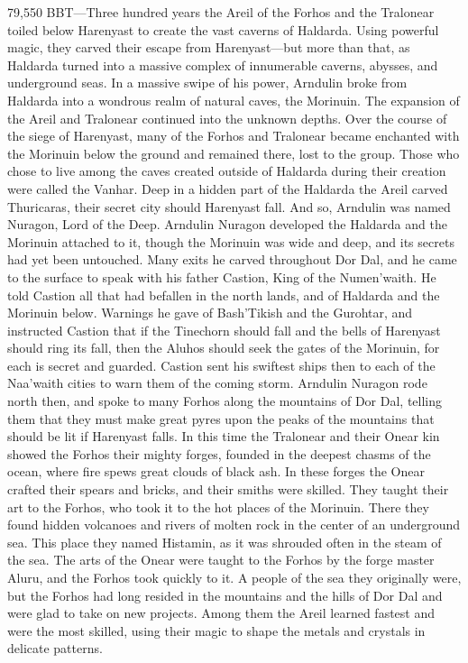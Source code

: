 \documentclass[smalldemyvopaper,11pt,twoside,onecolumn,openright,extrafontsizes]{memoir}
\begin{document}
79,550 BBT—Three hundred years the Areil of the Forhos and the Tralonear toiled below Harenyast to create the vast caverns of Haldarda. Using powerful magic, they carved their escape from Harenyast—but more than that, as Haldarda turned into a massive complex of innumerable caverns, abysses, and underground seas. In a massive swipe of his power, Arndulin broke from Haldarda into a wondrous realm of natural caves, the Morinuin. The expansion of the Areil and Tralonear continued into the unknown depths. Over the course of the siege of Harenyast, many of the Forhos and Tralonear became enchanted with the Morinuin below the ground and remained there, lost to the group. Those who chose to live among the caves created outside of Haldarda during their creation were called the Vanhar. Deep in a hidden part of the Haldarda the Areil carved Thuricaras, their secret city should Harenyast fall. And so, Arndulin was named Nuragon, Lord of the Deep. Arndulin Nuragon developed the Haldarda and the Morinuin attached to it, though the Morinuin was wide and deep, and its secrets had yet been untouched. Many exits he carved throughout Dor Dal, and he came to the surface to speak with his father Castion, King of the Numen’waith. He told Castion all that had befallen in the north lands, and of Haldarda and the Morinuin below. Warnings he gave of Bash’Tikish and the Gurohtar, and instructed Castion that if the Tinechorn should fall and the bells of Harenyast should ring its fall, then the Aluhos should seek the gates of the Morinuin, for each is secret and guarded. Castion sent his swiftest ships then to each of the Naa’waith cities to warn them of the coming storm. Arndulin Nuragon rode north then, and spoke to many Forhos along the mountains of Dor Dal, telling them that they must make great pyres upon the peaks of the mountains that should be lit if Harenyast falls.
	In this time the Tralonear and their Onear kin showed the Forhos their mighty forges, founded in the deepest chasms of the ocean, where fire spews great clouds of black ash. In these forges the Onear crafted their spears and bricks, and their smiths were skilled. They taught their art to the Forhos, who took it to the hot places of the Morinuin. There they found hidden volcanoes and rivers of molten rock in the center of an underground sea. This place they named Histamin, as it was shrouded often in the steam of the sea. The arts of the Onear were taught to the Forhos by the forge master Aluru, and the Forhos took quickly to it. A people of the sea they originally were, but the Forhos had long resided in the mountains and the hills of Dor Dal and were glad to take on new projects. Among them the Areil learned fastest and were the most skilled, using their magic to shape the metals and crystals in delicate patterns. 
\end{document}
